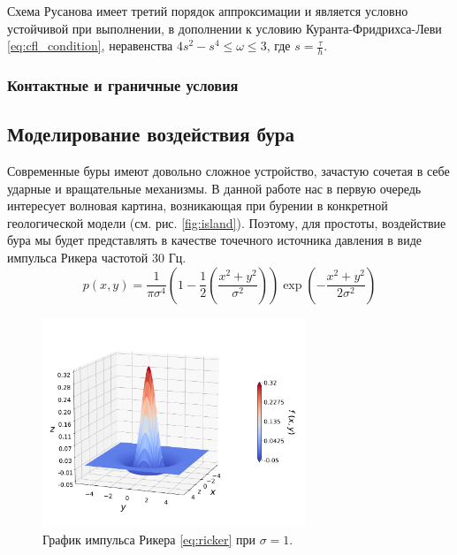 Схема Русанова имеет третий порядок аппроксимации и является условно устойчивой при выполнении, в дополнении к условию Куранта-Фридрихса-Леви \eqref{eq:cfl_condition}, неравенства $4s^2 - s^4 \leq \omega \leq 3$, где $s = \frac{\tau}{h}$.

\subsubsection{Контактные и граничные условия}

\subsection{Моделирование воздействия бура}

Современные буры имеют довольно сложное устройство, зачастую  сочетая в себе ударные и вращательные механизмы. В данной работе нас в первую очередь интересует волновая картина, возникающая при бурении в конкретной геологической модели (см. рис. \autoref{fig:island}). Поэтому, для простоты, воздействие бура мы будет представлять в качестве точечного источника давления в виде импульса Рикера частотой 30 Гц.
\begin{equation}
    p(x,y) = \dfrac{1}{\pi \sigma^4} \left(1-\dfrac{1}{2}\left(\dfrac{x^2+y^2}{\sigma^2}\right)\right) \exp\left({-\frac{x^2+y^2}{2\sigma^2}}\right)
    \label{eq:ricker}
\end{equation}

\begin{figure}[htb]
    \centering
    \includegraphics[trim={0pt 45pt 0pt 80pt},clip,width=0.7\textwidth]{images/gas_field/ricker_wavelet.png}
    \caption{График импульса Рикера \eqref{eq:ricker} при $\sigma=1$.}
    \label{fig:ricker_plot}
\end{figure}


